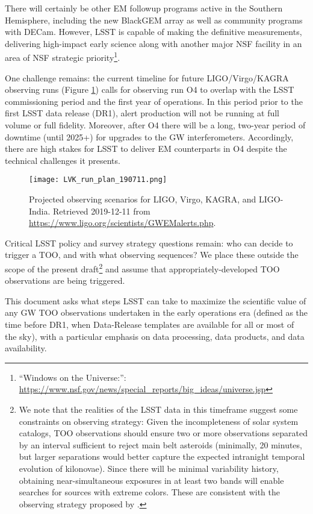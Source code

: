 \documentclass[OPS,toc,lsstdraft]{lsstdoc}
\begin{document}
There will certainly be other EM followup programs active in the Southern Hemisphere, including the new BlackGEM array as well as community programs with DECam.
However, LSST is capable of making the definitive measurements, delivering high-impact early science along with another major NSF facility in an area of NSF strategic priority\footnote{``Windows on the Universe:'': \url{https://www.nsf.gov/news/special_reports/big_ideas/universe.jsp}}.

One challenge remains: the current timeline for future LIGO/Virgo/KAGRA observing runs (Figure \ref{fig:scenarios}) calls for observing run O4 to overlap with the LSST commissioning period and the first year of operations.
In this period prior to the first LSST data release (DR1), alert production will not be running at full volume or full fidelity.
Moreover, after O4 there will be a long, two-year period of downtime (until 2025+) for upgrades to the GW interferometers.  
Accordingly, there are high stakes for LSST to deliver EM counterparts in O4 despite the technical challenges it presents.

\begin{figure}
\texttt{[image: LVK\_run\_plan\_190711.png]}
\caption{Projected observing scenarios for LIGO, Virgo, KAGRA, and LIGO-India.  Retrieved 2019-12-11 from 
\url{https://www.ligo.org/scientists/GWEMalerts.php}.
	\label{fig:scenarios}}
\end{figure}

Critical LSST policy and survey strategy questions remain: who can decide to trigger a TOO, and with what observing sequences?  
We place these outside the scope of the present draft\footnote{We note that the realities of the LSST data in this timeframe suggest some constraints on observing strategy:  
Given the incompleteness of solar system catalogs, TOO observations should ensure two or more observations separated by an interval sufficient to reject main belt asteroids (minimally, 20 minutes, but larger separations would better capture the expected intranight temporal evolution of kilonovae).  
Since there will be minimal variability history, obtaining near-simultaneous exposures in at least two bands will enable searches for sources with extreme colors.  
These are consistent with the observing strategy proposed by \citet{2018arXiv181204051M}.} and assume that appropriately-developed TOO observations are being triggered.

This document asks what steps LSST can take to maximize the scientific value of any GW TOO observations undertaken in the early operations era (defined as the time before DR1, when Data-Release templates are available for all or most of the sky), with a particular emphasis on data processing, data products, and data availability.
\end{document}
